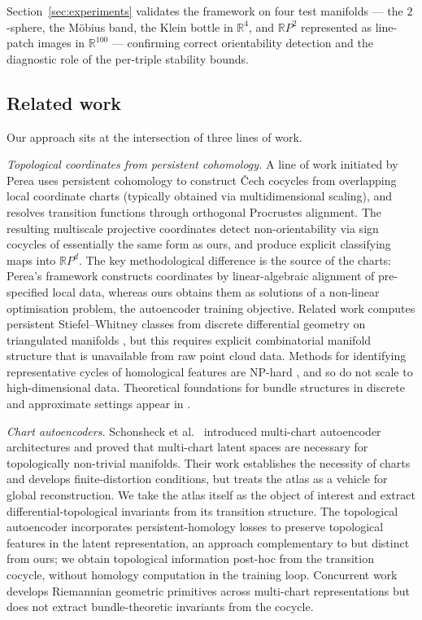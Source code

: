 \documentclass[11pt]{article}
\newcommand{\R}{\mathbb{R}}
\theoremstyle{plain}
\theoremstyle{definition}
\theoremstyle{remark}
\begin{document}
Section~\ref{sec:experiments} validates the framework on four test manifolds — the $2$-sphere, the M\"obius band, the Klein bottle in $\R^4$, and $\mathbb{R}P^2$ represented as line-patch images in $\R^{100}$ — confirming correct orientability detection and the diagnostic role of the per-triple stability bounds.

\subsection*{Related work}

Our approach sits at the intersection of three lines of work.

\emph{Topological coordinates from persistent cohomology.}
A line of work initiated by Perea \cite{10.1007/s00454-017-9927-2,DBLP:conf/compgeom/ScoccolaP23,Scoccola_Perea_2023} uses persistent cohomology to construct \v{C}ech cocycles from overlapping local coordinate charts (typically obtained via multidimensional scaling), and resolves transition functions through orthogonal Procrustes alignment. The resulting multiscale projective coordinates detect non-orientability via sign cocycles of essentially the same form as ours, and produce explicit classifying maps into $\mathbb{R}P^d$. The key methodological difference is the source of the charts: Perea's framework constructs coordinates by linear-algebraic alignment of pre-specified local data, whereas ours obtains them as solutions of a non-linear optimisation problem, the autoencoder training objective. Related work computes persistent Stiefel--Whitney classes from discrete differential geometry on triangulated manifolds \cite{Tinarrage_2021}, but this requires explicit combinatorial manifold structure that is unavailable from raw point cloud data. Methods for identifying representative cycles of homological features \cite{10.1109/SMI.2007.25,yiding_2009} are NP-hard \cite{Chen2011}, and so do not scale to high-dimensional data. Theoretical foundations for bundle structures in discrete and approximate settings appear in \cite{Scoccola_Perea_2023,scoccola2023fiberedfiberwisedimensionalityreduction}.

\emph{Chart autoencoders.}
Schonsheck et al.\ \cite{schonsheck2020chartautoencodersmanifoldstructured,schonsheck2024semisupervisedmanifoldlearningcomplexity} introduced multi-chart autoencoder architectures and proved that multi-chart latent spaces are necessary for topologically non-trivial manifolds. Their work establishes the necessity of charts and develops finite-distortion conditions, but treats the atlas as a vehicle for global reconstruction. We take the atlas itself as the object of interest and extract differential-topological invariants from its transition structure. The topological autoencoder \cite{11301037} incorporates persistent-homology losses to preserve topological features in the latent representation, an approach complementary to but distinct from ours; we obtain topological information post-hoc from the transition cocycle, without homology computation in the training loop. Concurrent work \cite{robinett2026atlasbased,yu2026learninggeometrytopologymultichart} develops Riemannian geometric primitives across multi-chart representations but does not extract bundle-theoretic invariants from the cocycle.
\end{document}
